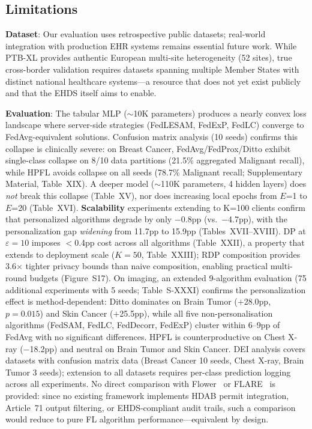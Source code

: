 \documentclass[conference,a4paper]{IEEEtran}
\begin{document}
\subsection{Limitations}

\textbf{Dataset}: Our evaluation uses retrospective public datasets; real-world integration with production EHR systems remains essential future work. While PTB-XL provides authentic European multi-site heterogeneity (52 sites), true cross-border validation requires datasets spanning multiple Member States with distinct national healthcare systems---a resource that does not yet exist publicly and that the EHDS itself aims to enable.

\textbf{Evaluation}: The tabular MLP ($\sim$10K parameters) produces a nearly convex loss landscape where server-side strategies (FedLESAM, FedExP, FedLC) converge to FedAvg-equivalent solutions. Confusion matrix analysis (10 seeds) confirms this collapse is clinically severe: on Breast Cancer, FedAvg/FedProx/Ditto exhibit single-class collapse on 8/10 data partitions (21.5\% aggregated Malignant recall), while HPFL avoids collapse on all seeds (78.7\% Malignant recall; Supplementary Material, Table~XIX). A deeper model ($\sim$110K parameters, 4 hidden layers) does \textit{not} break this collapse (Table~XV), nor does increasing local epochs from $E$=1 to $E$=20 (Table~XVI). \textbf{Scalability} experiments extending to K=100 clients confirm that personalized algorithms degrade by only $-$0.8pp (vs.\ $-$4.7pp), with the personalization gap \textit{widening} from 11.7pp to 15.9pp (Tables~XVII--XVIII). DP at $\varepsilon{=}10$ imposes $<$0.4pp cost across all algorithms (Table~XXII), a property that extends to deployment scale ($K{=}50$, Table~XXIII); RDP composition provides 3.6$\times$ tighter privacy bounds than naive composition, enabling practical multi-round budgets (Figure~S17). On imaging, an extended 9-algorithm evaluation (75 additional experiments with 5 seeds; Table~S-XXXI) confirms the personalization effect is method-dependent: Ditto dominates on Brain Tumor ($+$28.0pp, $p{=}0.015$) and Skin Cancer ($+$25.5pp), while all five non-personalisation algorithms (FedSAM, FedLC, FedDecorr, FedExP) cluster within 6--9pp of FedAvg with no significant differences. HPFL is counterproductive on Chest X-ray ($-$18.2pp) and neutral on Brain Tumor and Skin Cancer. DEI analysis covers datasets with confusion matrix data (Breast Cancer 10 seeds, Chest X-ray, Brain Tumor 3 seeds); extension to all datasets requires per-class prediction logging across all experiments. No direct comparison with Flower~\cite{beutel2023flower} or FLARE~\cite{nvflare2023} is provided: since no existing framework implements HDAB permit integration, Article~71 output filtering, or EHDS-compliant audit trails, such a comparison would reduce to pure FL algorithm performance---equivalent by design.
\end{document}
